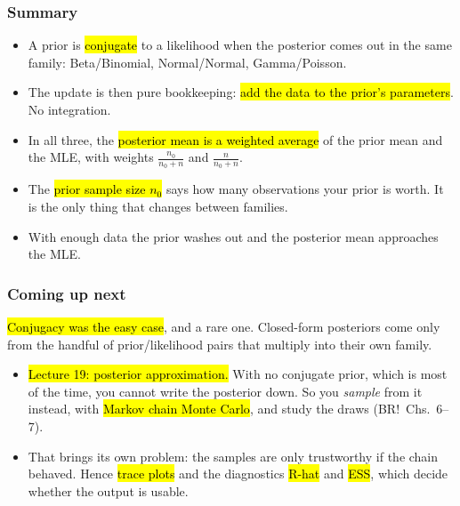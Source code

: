 \documentclass[slidestop,compress,mathserif]{beamer}
\begin{document}
\begin{frame}
\frametitle{Summary}

\begin{itemize}
\item A prior is \hl{conjugate} to a likelihood when the posterior comes out in the same family: Beta/Binomial, Normal/Normal, Gamma/Poisson.
\pause
\item The update is then pure bookkeeping: \hl{add the data to the prior's parameters}. No integration.
\pause
\item In all three, the \hl{posterior mean is a weighted average} of the prior mean and the MLE, with weights $\frac{n_0}{n_0+n}$ and $\frac{n}{n_0+n}$.
\pause
\item The \hl{prior sample size $n_0$} says how many observations your prior is worth. It is the only thing that changes between families.
\pause
\item With enough data the prior washes out and the posterior mean approaches the MLE.
\end{itemize}

\end{frame}

\begin{frame}
\frametitle{Coming up next}

\hl{Conjugacy was the easy case}, and a rare one. Closed-form posteriors come only from the handful of prior/likelihood pairs that multiply into their own family.

\vspace{0.4em}
\begin{itemize}
\item \hl{Lecture 19: posterior approximation.} With no conjugate prior, which is most of the time, you cannot write the posterior down. So you \emph{sample} from it instead, with \hl{Markov chain Monte Carlo}, and study the draws (BR!\ Chs.\ 6--7).
\pause
\item That brings its own problem: the samples are only trustworthy if the chain behaved. Hence \hl{trace plots} and the diagnostics \hl{R-hat} and \hl{ESS}, which decide whether the output is usable.
\end{itemize}

\end{frame}
\end{document}
